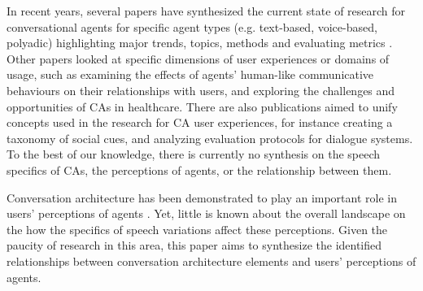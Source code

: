 In recent years, several papers have synthesized the current state of research for conversational agents for specific agent types (e.g. text-based, voice-based, polyadic) highlighting major trends, topics, methods and evaluating metrics \cite{clark2019state, rapp2021human, zheng2022ux}\cmt{[33][5]}. Other papers looked at specific dimensions of user experiences or domains of usage, such as \citet{van2020human} examining the effects of agents' human-like communicative behaviours on their relationships with users, and \citet{kocaballi2022design} exploring the challenges and opportunities of CAs in healthcare. There are also publications aimed to unify concepts used in the research for CA user experiences, for instance \citet{feine2019taxonomy} creating a taxonomy of social cues, and \citet{finch2020towards} analyzing evaluation protocols for dialogue systems. To the best of our knowledge, there is currently no synthesis on the speech specifics of CAs, the perceptions of agents, or the relationship between them.

Conversation architecture has been demonstrated to play an important role in users' perceptions of agents \cite{knijnenburg2016inferring, moussawi2021perceptions, seeger2021chatbots}\cmt{[35]}. Yet, little is known about the overall landscape on the how the specifics of speech variations affect these perceptions. Given the paucity of research in this area, this paper aims to synthesize the identified relationships between conversation architecture elements and users' perceptions of agents.